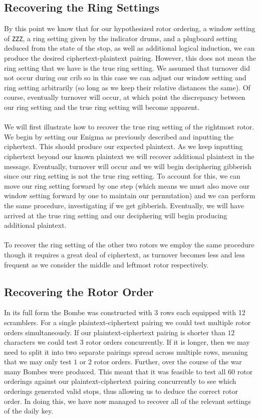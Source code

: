 \subsection{Recovering the Ring Settings}\label{bombe_ring_setting}
By this point we know that for our hypothesized rotor ordering, a
window setting of \texttt{ZZZ}, a ring setting given by the indicator
drums, and a plugboard setting deduced from the state of the stop, as
well as additional logical induction, we can produce the desired
ciphertext-plaintext pairing. However, this does not mean the ring
setting that we have is the true ring setting. We assumed that
turnover did not occur during our crib so in this case we can adjust
our window setting and ring setting arbitrarily (so long as we keep
their relative distances the same). Of course, eventually turnover
will occur, at which point the discrepancy between our ring setting
and the true ring setting will become apparent.
\\\\We will first illustrate how to recover the true ring setting of
the rightmost rotor. We begin by setting our Enigma as previously
described and inputting the ciphertext. This should produce our
expected plaintext. As we keep inputting ciphertext beyond our known
plaintext we will recover additional plaintext in the message.
Eventually, turnover will occur and we will begin deciphering
gibberish since our ring setting is not the true ring setting. To
account for this, we can move our ring setting forward by one step
(which means we must also move our window setting forward by one to
maintain our permutation) and we can perform the same procedure,
investigating if we get gibberish. Eventually, we will have arrived
at the true ring setting and our deciphering will begin producing
additional plaintext.
\\\\To recover the ring setting of the other two rotors we employ the
same procedure though it requires a great deal of ciphertext, as
turnover becomes less and less frequent as we consider the middle and
leftmost rotor respectively.

\subsection{Recovering the Rotor Order}
In its full form the Bombe was constructed with $3$ rows each
equipped with 12 scramblers. For a single plaintext-ciphertext
pairing we could test multiple rotor orders simultaneously. If our
plaintext-ciphertext pairing is shorter than $12$ characters we could
test $3$ rotor orders concurrently. If it is longer, then we may need
to split it into two separate pairings spread across multiple rows,
meaning that we may only test $1$ or $2$ rotor orders. Further, over
the course of the war many Bombes were produced. This meant that it
was feasible to test all $60$ rotor orderings against our
plaintext-ciphertext pairing concurrently to see which orderings generated valid
stops, thus allowing us to deduce the correct rotor order. In doing
this, we have now managed to recover all of the relevant settings of
the daily key.

